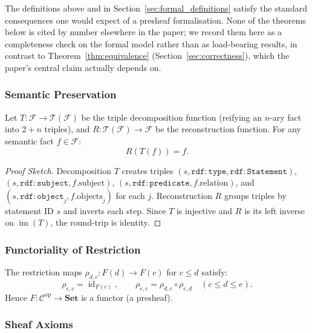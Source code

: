 The definitions above and in Section~\ref{sec:formal_definitions} satisfy
the standard consequences one would expect of a presheaf formalisation.
None of the theorems below is cited by number elsewhere in the paper; we
record them here as a completeness check on the formal model rather than
as load-bearing results, in contrast to Theorem~\ref{thm:equivalence}
(Section~\ref{sec:correctness}), which the paper's central claim actually
depends on.

\subsubsection{Semantic Preservation}
\label{sec:thm:preservation}

\begin{theorem}
\label{thm:preservation}
Let $T: \mathcal{F} \to \mathcal{T}(\mathcal{F})$ be the triple decomposition
function (reifying an $n$-ary fact into $2+n$ triples), and
$R: \mathcal{T}(\mathcal{F}) \to \mathcal{F}$ be the reconstruction function.
For any semantic fact $f \in \mathcal{F}$:
\[
R(T(f)) = f.
\]
\end{theorem}

\begin{proof}[Proof Sketch]
Decomposition $T$ creates triples $(s, \mathtt{rdf:type}, \mathtt{rdf:Statement})$,
$(s, \mathtt{rdf:subject}, f.\text{subject})$, $(s, \mathtt{rdf:predicate}, f.\text{relation})$,
and $(s, \mathtt{rdf:object}_j, f.\text{objects}_j)$ for each $j$.
Reconstruction $R$ groups triples by statement ID $s$ and inverts each step.
Since $T$ is injective and $R$ is its left inverse on $\operatorname{im}(T)$,
the round-trip is identity.
\end{proof}

\subsubsection{Functoriality of Restriction}

\begin{theorem}
\label{thm:restriction}
The restriction maps $\rho_{d,c}: F(d) \to F(c)$ for $c \leq d$ satisfy:
\[
\rho_{c,c} = \operatorname{id}_{F(c)}, \qquad
\rho_{e,c} = \rho_{d,c} \circ \rho_{e,d} \quad (c \leq d \leq e).
\]
Hence $F: \mathcal{C}^{\mathrm{op}} \to \mathbf{Set}$ is a functor (a presheaf).
\end{theorem}

\subsubsection{Sheaf Axioms}

